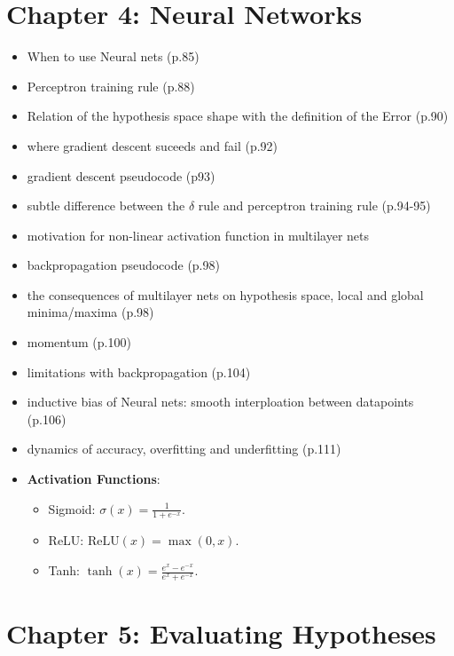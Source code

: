 \documentclass[10pt,a4paper]{article}
\begin{document}
\section*{Chapter 4: Neural Networks}
\begin{itemize}
	\item When to use Neural nets (p.85)
	\item Perceptron training rule (p.88)
	\item Relation of the hypothesis space shape with the definition of the Error (p.90)
	\item where gradient descent suceeds and fail (p.92)
	\item gradient descent pseudocode (p93)
	\item subtle difference between the $\delta$ rule and perceptron training rule (p.94-95)
	\item motivation for non-linear activation function in multilayer nets
	\item backpropagation pseudocode (p.98)
	\item the consequences of multilayer nets on hypothesis space, local and global minima/maxima (p.98)
	\item momentum (p.100)
	\item limitations with backpropagation (p.104)
	\item inductive bias of Neural nets: smooth interploation between datapoints (p.106)	
	\item dynamics of accuracy, overfitting and underfitting (p.111)
	
	\item \textbf{Activation Functions}:
	\begin{itemize}
		\item Sigmoid: \( \sigma(x) = \frac{1}{1 + e^{-x}} \).
		\item ReLU: \( \text{ReLU}(x) = \max(0, x) \).
		\item Tanh: \( \tanh(x) = \frac{e^x - e^{-x}}{e^x + e^{-x}} \).
	\end{itemize}
\end{itemize}
\section*{Chapter 5: Evaluating Hypotheses}
\end{document}
